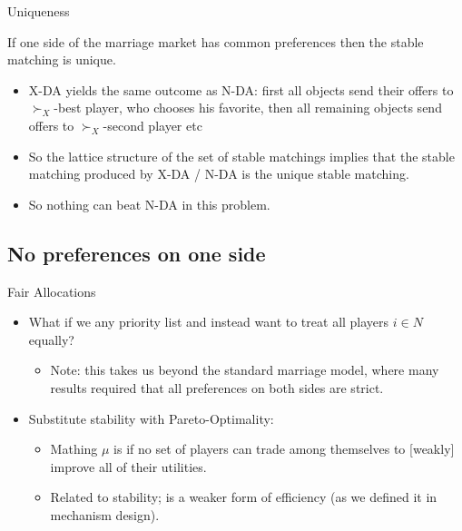 \documentclass[english,10pt
,aspectratio=169
]{beamer}
\begin{document}
\begin{frame}{Uniqueness}
\begin{theorem}
	If one side of the marriage market has common preferences then the stable matching is \alert{unique}.
\end{theorem}
\begin{itemize}
	\item X-DA yields the same outcome as N-DA: first all objects send their offers to $\succ_X$-best player, who chooses his favorite, then all remaining objects send offers to $\succ_X$-second player etc
	\item So the lattice structure of the set of stable matchings implies that the stable matching produced by X-DA / N-DA is the unique stable matching.
	\item So nothing can beat N-DA in this problem.
\end{itemize}
\end{frame}


\subsection{No preferences on one side}

\begin{frame}{Fair Allocations}
\begin{itemize}
	\item What if we  any priority list  and instead want to treat all players $i \in N$ equally?
	\begin{itemize}
		\item Note: this takes us beyond the standard marriage model, where many results required that all preferences on both sides are strict.
	\end{itemize}
	\item Substitute stability with Pareto-Optimality:
	\begin{itemize}
		\item Mathing $\mu$ is  if no set of players can trade among themselves to [weakly] improve all of their utilities.
		\item Related to stability; is a weaker form of efficiency (as we defined it in mechanism design).
	\end{itemize}
\end{itemize}
\end{frame}
\end{document}
